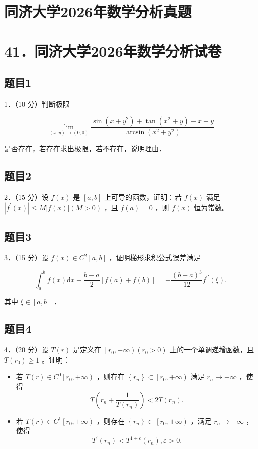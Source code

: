 \documentclass{article}
\begin{document}
\section*{同济大学2026年数学分析真题}
\section*{41．同济大学2026年数学分析试卷}

\subsection{题目1}
1．（10 分）判断极限

\[
\lim _{(x, y) \rightarrow(0,0)} \frac{\sin \left(x+y^{2}\right)+\tan \left(x^{2}+y\right)-x-y}{\arcsin \left(x^{2}+y^{2}\right)}
\]

是否存在，若存在求出极限，若不存在，说明理由．

\subsection{题目2}
2．（15 分）设 \(f(x)\) 是 \([a, b]\) 上可导的函数，证明：若 \(f(x)\) 满足 \(\left|f^{\prime}(x)\right| \leq M|f(x)|(M>0)\) ，且 \(f(a)=0\) ，则 \(f(x)\) 恒为常数。

\subsection{题目3}
3．（15 分）设 \(f(x) \in C^{2}[a, b]\) ，证明梯形求积公式误差满足

\[
\int_{a}^{b} f(x) \mathrm{d} x-\frac{b-a}{2}[f(a)+f(b)]=-\frac{(b-a)^{3}}{12} f^{\prime \prime}(\xi) .
\]

其中 \(\xi \in[a, b]\) ．

\subsection{题目4}
4．（20 分）设 \(T(r)\) 是定义在 \(\left[r_{0},+\infty\right)\left(r_{0}>0\right)\) 上的一个单调递增函数，且 \(T\left(r_{0}\right) \geq 1\) 。证明：

\begin{itemize}
  \item[（1）] 若 \(T(r) \in C^{0}\left[r_{0},+\infty\right)\) ，则存在 \(\left\{r_{n}\right\} \subset\left[r_{0},+\infty\right)\) 满足 \(r_{n} \rightarrow+\infty\) ，使得
\[
T\left(r_{n}+\frac{1}{T\left(r_{n}\right)}\right)<2 T\left(r_{n}\right) .
\]
  \item[（2）] 若 \(T(r) \in C^{1}\left[r_{0},+\infty\right)\) ，则存在 \(\left\{r_{n}\right\} \subset\left[r_{0},+\infty\right)\) ，满足 \(r_{n} \rightarrow+\infty\) ，使得
\[
T^{\prime}\left(r_{n}\right)<T^{1+\varepsilon}\left(r_{n}\right), \varepsilon>0 .
\]
\end{itemize}
\end{document}
